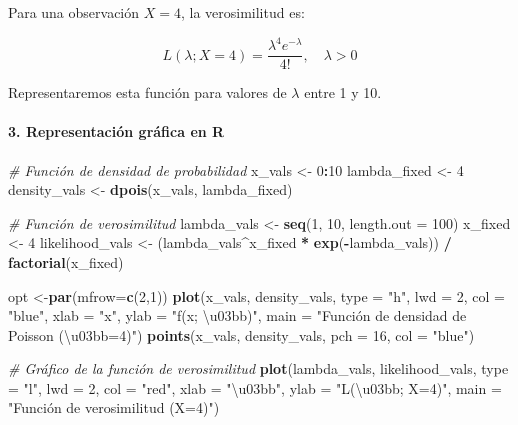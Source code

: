\documentclass[
]{article}
\newenvironment{Shaded}{\begin{snugshade}}{\end{snugshade}}
\newcommand{\AttributeTok}[1]{\textcolor[rgb]{0.13,0.29,0.53}{#1}}
\newcommand{\CommentTok}[1]{\textcolor[rgb]{0.56,0.35,0.01}{\textit{#1}}}
\newcommand{\DecValTok}[1]{\textcolor[rgb]{0.00,0.00,0.81}{#1}}
\newcommand{\FunctionTok}[1]{\textcolor[rgb]{0.13,0.29,0.53}{\textbf{#1}}}
\newcommand{\NormalTok}[1]{#1}
\newcommand{\OtherTok}[1]{\textcolor[rgb]{0.56,0.35,0.01}{#1}}
\newcommand{\SpecialCharTok}[1]{\textcolor[rgb]{0.81,0.36,0.00}{\textbf{#1}}}
\newcommand{\StringTok}[1]{\textcolor[rgb]{0.31,0.60,0.02}{#1}}
\begin{document}
Para una observación \(X = 4\), la verosimilitud es:

\[
L(\lambda; X = 4) = \frac{\lambda^4 e^{-\lambda}}{4!}, \quad \lambda > 0
\]

Representaremos esta función para valores de \(\lambda\) entre 1 y 10.

\paragraph{3. Representación gráfica en R}\label{representaciuxf3n-gruxe1fica-en-r}

\begin{Shaded}
\begin{Highlighting}[]
\CommentTok{\# Función de densidad de probabilidad}
\NormalTok{x\_vals }\OtherTok{\textless{}{-}} \DecValTok{0}\SpecialCharTok{:}\DecValTok{10}
\NormalTok{lambda\_fixed }\OtherTok{\textless{}{-}} \DecValTok{4}
\NormalTok{density\_vals }\OtherTok{\textless{}{-}} \FunctionTok{dpois}\NormalTok{(x\_vals, lambda\_fixed)}

\CommentTok{\# Función de verosimilitud}
\NormalTok{lambda\_vals }\OtherTok{\textless{}{-}} \FunctionTok{seq}\NormalTok{(}\DecValTok{1}\NormalTok{, }\DecValTok{10}\NormalTok{, }\AttributeTok{length.out =} \DecValTok{100}\NormalTok{)}
\NormalTok{x\_fixed }\OtherTok{\textless{}{-}} \DecValTok{4}
\NormalTok{likelihood\_vals }\OtherTok{\textless{}{-}}\NormalTok{ (lambda\_vals}\SpecialCharTok{\^{}}\NormalTok{x\_fixed }\SpecialCharTok{*} \FunctionTok{exp}\NormalTok{(}\SpecialCharTok{{-}}\NormalTok{lambda\_vals)) }\SpecialCharTok{/} \FunctionTok{factorial}\NormalTok{(x\_fixed)}

\NormalTok{opt }\OtherTok{\textless{}{-}}\FunctionTok{par}\NormalTok{(}\AttributeTok{mfrow=}\FunctionTok{c}\NormalTok{(}\DecValTok{2}\NormalTok{,}\DecValTok{1}\NormalTok{))}
\FunctionTok{plot}\NormalTok{(x\_vals, density\_vals, }
     \AttributeTok{type =} \StringTok{"h"}\NormalTok{, }\AttributeTok{lwd =} \DecValTok{2}\NormalTok{, }\AttributeTok{col =} \StringTok{"blue"}\NormalTok{,}
     \AttributeTok{xlab =} \StringTok{"x"}\NormalTok{, }\AttributeTok{ylab =} \StringTok{"f(x; \textbackslash{}u03bb)"}\NormalTok{,}
     \AttributeTok{main =} \StringTok{"Función de densidad de Poisson (\textbackslash{}u03bb=4)"}\NormalTok{)}
\FunctionTok{points}\NormalTok{(x\_vals, density\_vals, }\AttributeTok{pch =} \DecValTok{16}\NormalTok{, }\AttributeTok{col =} \StringTok{"blue"}\NormalTok{)}


\CommentTok{\# Gráfico de la función de verosimilitud}
\FunctionTok{plot}\NormalTok{(lambda\_vals, likelihood\_vals, }\AttributeTok{type =} \StringTok{"l"}\NormalTok{, }\AttributeTok{lwd =} \DecValTok{2}\NormalTok{, }\AttributeTok{col =} \StringTok{"red"}\NormalTok{,}
     \AttributeTok{xlab =} \StringTok{"\textbackslash{}u03bb"}\NormalTok{, }\AttributeTok{ylab =} \StringTok{"L(\textbackslash{}u03bb; X=4)"}\NormalTok{, }\AttributeTok{main =} \StringTok{"Función de verosimilitud (X=4)"}\NormalTok{)}
\end{Highlighting}
\end{Shaded}
\end{document}
